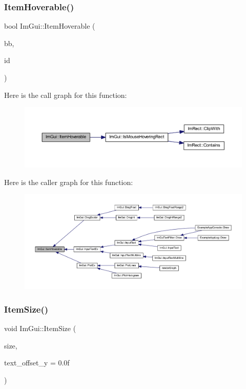 \subsubsection{\texorpdfstring{Item\+Hoverable()}{ItemHoverable()}}
{\footnotesize\ttfamily bool Im\+Gui\+::\+Item\+Hoverable (\begin{DoxyParamCaption}\item[{const \mbox{\hyperlink{struct_im_rect}{Im\+Rect}} \&}]{bb,  }\item[{\mbox{\hyperlink{imgui_8h_a1785c9b6f4e16406764a85f32582236f}{Im\+Gui\+ID}}}]{id }\end{DoxyParamCaption})}

Here is the call graph for this function\+:
\nopagebreak
\begin{figure}[H]
\begin{center}
\leavevmode
\includegraphics[width=350pt]{namespace_im_gui_a488b86a9f235923304186fb86ff64ffb_cgraph}
\end{center}
\end{figure}
Here is the caller graph for this function\+:
\nopagebreak
\begin{figure}[H]
\begin{center}
\leavevmode
\includegraphics[width=350pt]{namespace_im_gui_a488b86a9f235923304186fb86ff64ffb_icgraph}
\end{center}
\end{figure}
\mbox{\label{namespace_im_gui_ac7b9a7399d9606b25278002303f545b6}} 
\subsubsection{\texorpdfstring{Item\+Size()}{ItemSize()}\hspace{0.1cm}{\footnotesize\ttfamily [1/2]}}
{\footnotesize\ttfamily void Im\+Gui\+::\+Item\+Size (\begin{DoxyParamCaption}\item[{const \mbox{\hyperlink{struct_im_vec2}{Im\+Vec2}} \&}]{size,  }\item[{float}]{text\+\_\+offset\+\_\+y = {\ttfamily 0.0f} }\end{DoxyParamCaption})}

